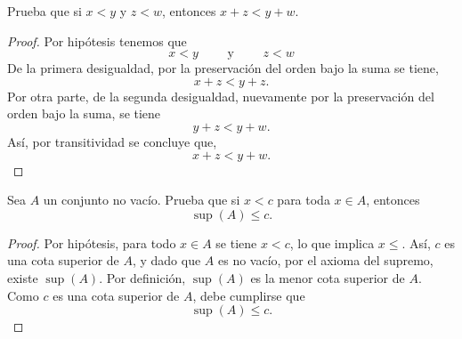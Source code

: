\documentclass[12pt,a4paper]{article}
\begin{document}
    \begin{problema}
        Prueba que si $x\lt y$ y $z\lt w$, entonces $x+z\lt y+w$.
    \end{problema}

    \begin{proof}
        Por hipótesis tenemos que
        \begin{equation*}
            x\lt y\qquad\text{ y }\qquad z\lt w
        \end{equation*}
        De la primera desigualdad, por la preservación del orden bajo la suma se tiene,
        \begin{equation*}
            x+z\lt y+z.
        \end{equation*}
        Por otra parte, de la segunda desigualdad, nuevamente por la preservación del orden bajo la suma, se tiene
        \begin{equation*}
            y+z\lt y+w.
        \end{equation*}
        Así, por transitividad se concluye que,
        \begin{equation*}
            x+z\lt y+w.
        \end{equation*}
    \end{proof}

    \begin{problema}
        Sea $A$ un conjunto no vacío. Prueba que si $x\lt c$ para toda $x\in A$, entonces
        \begin{equation*}
            \sup(A)\leq c.
        \end{equation*}
    \end{problema}

    \begin{proof}
        Por hipótesis, para todo $x\in A$ se tiene $x\lt c$, lo que implica $x\leq$. Así, $c$ es una cota superior de $A$, y dado que $A$ es no vacío, por el axioma del
        supremo, existe $\sup(A)$. Por definición, $\sup(A)$ es la menor cota superior de $A$. Como $c$ es una cota superior de $A$, debe cumplirse que
        \begin{equation*}
            \sup(A)\leq c.
        \end{equation*}
    \end{proof}
\end{document}
